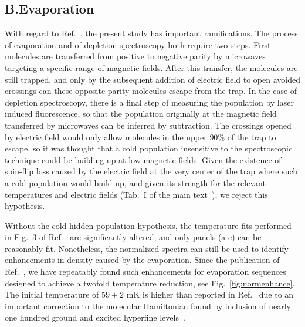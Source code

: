 \documentclass[%
 reprint,
 amsmath,amssymb,
 aps,
prl,
]{revtex4-1}
\begin{document}
\subsection{B.\quad Evaporation\label{sec:evap}}

With regard to Ref.~\cite{Stuhl2012evap}, the present study has important ramifications. 
The process of evaporation and of depletion spectroscopy both require two steps.
First molecules are transferred from positive to negative parity by microwaves targeting a specific range of magnetic fields.
After this transfer, the molecules are still trapped, and only by the subsequent addition of electric field to open avoided crossings can these opposite parity molecules escape from the trap.
In the case of depletion spectroscopy, there is a final step of measuring the population by laser induced fluorescence, so that the population originally at the magnetic field transferred by microwaves can be inferred by subtraction.
The crossings opened by electric field would only allow molecules in the upper $90\%$ of the trap to escape, so it was thought that a cold population insensitive to the spectroscopic technique could be building up at low magnetic fields.
Given the existence of spin-flip loss caused by the electric field at the very center of the trap where such a cold population would build up, and given its strength for the relevant temperatures and electric fields (Tab.~I of the main text~\cite{smt}), we reject this hypothesis.

Without the cold hidden population hypothesis, the temperature fits performed in Fig.~3 of Ref.~\cite{Stuhl2012evap} are significantly altered, and only panels (a-c) can be reasonably fit.
Nonetheless, the normalized spectra can still be used to identify enhancements in density caused by the evaporation.
Since the publication of Ref.~\cite{Stuhl2012evap}, we have repeatably found such enhancements for evaporation sequences designed to achieve a twofold temperature reduction, see Fig.~\ref{fig:normenhance}.
The initial temperature of $59\pm2\text{ mK}$ is higher than reported in Ref.~\cite{Stuhl2012evap} due to an important correction to the molecular Hamiltonian found by inclusion of nearly one hundred ground and excited hyperfine levels~\cite{Maeda2015}.
\end{document}
